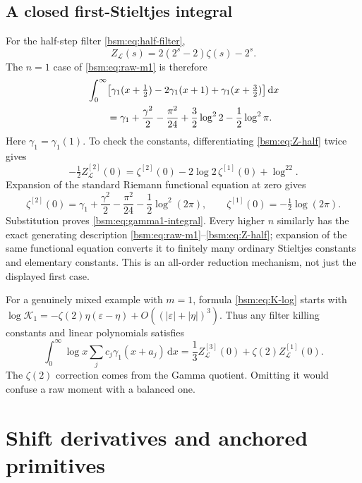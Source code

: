 \documentclass[11pt,letterpaper]{article}
\numberwithin{equation}{section}
\theoremstyle{definition}\newtheorem{definition}[theorem]{Definition}
\theoremstyle{remark}\newtheorem{remark}[theorem]{Remark}
\newcommand{\dd}{\,\mathrm{d}}
\newcommand{\Lcal}{\mathcal L}
\newcommand{\Kcal}{\mathcal K}
\newcommand{\eps}{\varepsilon}
\begin{document}
\subsection{A closed first-Stieltjes integral}
For the half-step filter \eqref{bsm:eq:half-filter},
\begin{equation}\label{bsm:eq:Z-half}
 Z_{\Lcal}(s)=2(2^s-2)\zeta(s)-2^s.
\end{equation}
The $n=1$ case of \eqref{bsm:eq:raw-m1} is therefore
\begin{align}\label{bsm:eq:gamma1-integral}
 &\int_0^\infty\bigl[
 \gamma_1(x+\tfrac12)-2\gamma_1(x+1)+\gamma_1(x+\tfrac32)
                         \bigr]\dd x\notag\\
 &\qquad=\gamma_1+\frac{\gamma^2}{2}-\frac{\pi^2}{24}
                     +\frac32\log^22-\frac12\log^2\pi.
\end{align}
Here $\gamma_1=\gamma_1(1)$. To check the constants, differentiating
\eqref{bsm:eq:Z-half} twice gives
\[
 -\tfrac12Z_{\Lcal}^{[2]}(0)
 =\zeta^{[2]}(0)-2\log2\,\zeta^{[1]}(0)+\log^22.
\]
Expansion of the standard Riemann functional equation at zero gives
\[
 \zeta^{[2]}(0)=\gamma_1+\frac{\gamma^2}{2}
                    -\frac{\pi^2}{24}-\frac12\log^2(2\pi),
 \qquad \zeta^{[1]}(0)=-\tfrac12\log(2\pi).
\]
Substitution proves \eqref{bsm:eq:gamma1-integral}.
Every higher $n$ similarly has the exact generating description
\eqref{bsm:eq:raw-m1}--\eqref{bsm:eq:Z-half}; expansion of the same functional
equation converts it to finitely many ordinary Stieltjes constants
and elementary constants. This is an all-order reduction mechanism,
not just the displayed first case.

For a genuinely mixed example with $m=1$, formula
\eqref{bsm:eq:K-log} starts with
$\log\Kcal_1=-\zeta(2)\eta(\eps-\eta)+O((|\eps|+|\eta|)^3)$.
Thus any filter killing constants and linear polynomials satisfies
\begin{equation}\label{bsm:eq:mixed-first}
 \int_0^\infty\log x\sum_jc_j\gamma_1(x+a_j)\dd x
       =\frac13Z_{\Lcal}^{[3]}(0)+\zeta(2)Z_{\Lcal}^{[1]}(0).
\end{equation}
The $\zeta(2)$ correction comes from the Gamma quotient. Omitting it
would confuse a raw moment with a balanced one.

\section{Shift derivatives and anchored primitives}\label{bsm:sec:calculus}
\end{document}
